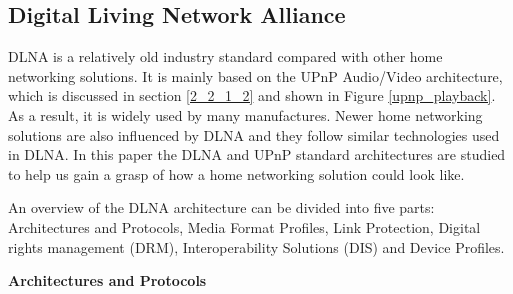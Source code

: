 \subsection[DLNA]{Digital Living Network Alliance\label{2_2_2}} 
DLNA is a relatively old industry standard compared with other home networking 
solutions. It is mainly based on the UPnP Audio/Video architecture, which is 
discussed in section \ref{2_2_1_2} and shown in Figure \ref{upnp_playback}. As a
result, it is widely used by many manufactures. Newer home networking solutions
are also influenced by DLNA and they follow similar technologies used in DLNA.
In this paper the DLNA and UPnP standard architectures are studied to help us
gain a grasp of how a home networking solution could look like.

An overview of the DLNA architecture \cite{dlna_guideline} can be divided into
five parts: Architectures and Protocols, Media Format Profiles, Link Protection,
Digital rights management (DRM), Interoperability Solutions (DIS) and Device
Profiles.

\textbf{Architectures and Protocols}

\begin{table}[htb] 
\caption{Key Technology Ingredients\label{dlna_key_tech} \cite{dlna_guideline}} 
\begin{center} 
\end{center} 
\end{table} 

